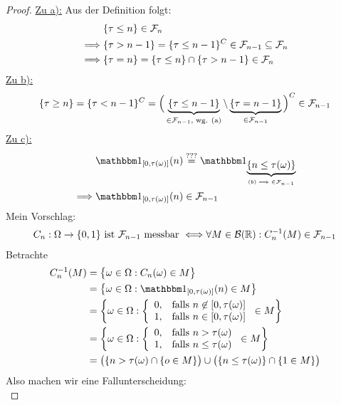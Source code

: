 \documentclass[12pt,a4paper]{article}
\begin{document}
\begin{proof}
\underline{Zu a):} Aus der Definition folgt:
\begin{align*}
	&\{\tau \leq n\} \in \mathcal{F}_n \\
	\implies & \{\tau > n-1\} = \{\tau \leq n-1\}^C \in \mathcal{F}_{n-1} \subseteq \mathcal{F}_n \\
	\implies & \{\tau = n\} = \{\tau \leq n\} \cap \{\tau > n-1\} \in \mathcal{F}_n
	\end{align*}
\underline{Zu b):}\\
\begin{align*}
	\{\tau \geq n \} =\lbrace\tau <n-1\rbrace^C= \Big(\underbrace{\{\tau \leq n-1 \}}_{\in\mathcal{F}_{n-1}\text{, wg. (a)}} \setminus \underbrace{\{\tau = n-1 \}}_{\in\mathcal{F}_{n-1}} \Big)^C \in \mathcal{F}_{n-1}
\end{align*}
\underline{Zu c):}\\
\begin{align*}
	&\indi_{[0,\tau(\omega)]}(n)\stackeq{???}\indi_{\underbrace{\{n\leq \tau(\omega)\}}_{(b) \implies \in\F_{n-1}}} \\
	\implies &\indi_{[0,\tau(\omega)]}(n) \in \F_{n-1}
\end{align*}
Mein Vorschlag:
\begin{align*}
C_n:\Omega\to\lbrace0,1\rbrace\text{ ist }\mathcal{F}_{n-1}\text{ messbar }\Longleftrightarrow\forall M\in\mathcal{B}(\mathbb{R}):C_n^{-1}(M)\in\mathcal{F}_{n-1}
\end{align*}
Betrachte
\begin{align*}
C_n^{-1}(M)
&=\big\lbrace\omega\in\Omega:C_n(\omega)\in M\big\rbrace\\
&=\left\lbrace\omega\in\Omega:\indi_{[0,\tau(\omega)]}(n)\in M\right\rbrace\\
&=\left\lbrace\omega\in\Omega:\left\lbrace\begin{array}{cl}
0, &\falls n\not\in[0,\tau(\omega)]\\
1, & \falls n\in[0,\tau(\omega)]
\end{array}\right.\in M\right\rbrace\\
&=\left\lbrace\omega\in\Omega:\left\lbrace\begin{array}{cl}
0, &\falls n>\tau(\omega)\\
1, &\falls n\leq\tau(\omega)
\end{array}\right.\in M\right\rbrace\\
&=\big(\lbrace n>\tau(\omega)\cap\lbrace o\in M\rbrace\big)\cup\big(\lbrace n\leq\tau(\omega)\rbrace\cap\lbrace 1\in M\rbrace\big)
\end{align*}
Also machen wir eine Fallunterscheidung:\\


\end{proof}
\end{document}
